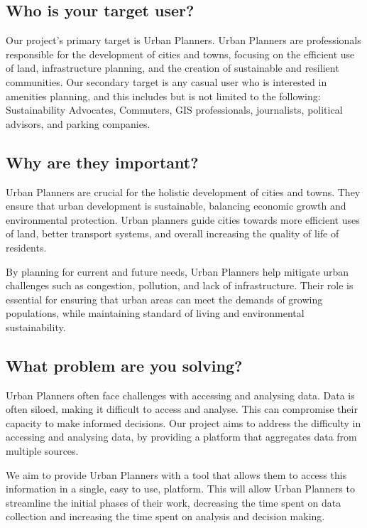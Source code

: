 \subsection{Who is your target user?}
Our project's primary target is Urban Planners. Urban Planners are professionals
responsible for the development of cities and towns, focusing on the efficient
use of land, infrastructure planning, and the creation of sustainable and resilient
communities. Our secondary target is any casual user who is interested in amenities
planning, and this includes but is not limited to the following: Sustainability
Advocates, Commuters, GIS professionals, journalists, political advisors, and
parking companies.

\subsection{Why are they important?}
Urban Planners are crucial for the holistic development of cities and towns.
They ensure that urban development is sustainable, balancing economic growth and
environmental protection. Urban planners guide cities towards more efficient
uses of land, better transport systems, and overall increasing the quality of
life of residents.

\noindent{}By planning for current and future needs, Urban Planners help mitigate urban
challenges such as congestion, pollution, and lack of infrastructure. Their role
is essential for ensuring that urban areas can meet the demands of growing
populations, while maintaining standard of living and environmental
sustainability.

\subsection{What problem are you solving?}
Urban Planners often face challenges with accessing and analysing data. Data is
often siloed, making it difficult to access and analyse. This can compromise
their capacity to make informed decisions. Our project aims to address the
difficulty in accessing and analysing data, by providing a platform that
aggregates data from multiple sources.

\noindent{}We aim to provide Urban Planners with a tool that allows them to access this
information in a single, easy to use, platform. This will allow Urban Planners
to streamline the initial phases of their work, decreasing the time spent on
data collection and increasing the time spent on analysis and decision making.